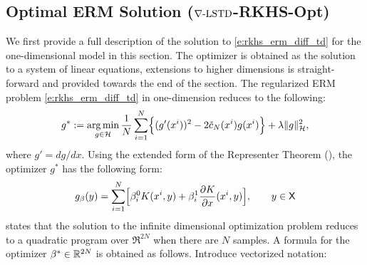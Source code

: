 \subsection{Optimal ERM Solution ($\nabla\text{-LSTD}$-RKHS-Opt)}
\label{sec:one_dimension}
We first provide a full description of the solution to \eqref{e:rkhs_erm_diff_td} for the one-dimensional model in this section. The optimizer is obtained as the solution to a system of linear equations, extensions to higher dimensions is straight-forward and provided towards the end of the section. 
The regularized ERM problem \eqref{e:rkhs_erm_diff_td} in one-dimension reduces to the following:
\begin{equation}
g^* := \argmin_{g\in\clH} \frac{1}{N} \sum_{i=1}^N \Bigl\{ (g'(x^i))^2 - 2 \tilc_N(x^i) g(x^i) \Bigr\} + \lambda \|g\|^2_\clH,
\label{e:rkhs_1dloss}
\end{equation}
where $g' = d g / d x$. Using the extended form of the Representer Theorem (), the optimizer $g^*$ has the following form:
\begin{equation}
g_\rkhsparam(y)= \sum_{i=1}^N \Bigl[\rkhsparam_i^{0} K(x^i,y) + \rkhsparam_i^{1} \frac{\partial K}{\partial x}(x^i,y)\Bigr], \qquad y \in \state
\label{e:rkhs_g_star}
\end{equation}
  states that the solution to  the infinite dimensional optimization problem reduces to a quadratic program over $\Re^{2N}$ when there are $N$ samples. A formula for the optimizer  $\beta^* \in \mathbb{R}^{2N}$ is obtained as follows.
Introduce vectorized notation:
